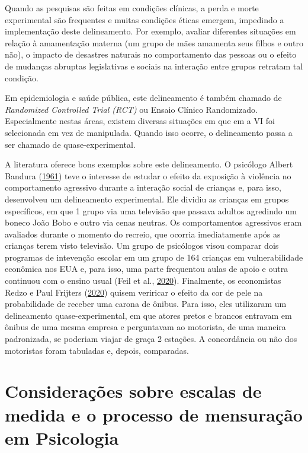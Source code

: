 \documentclass[
]{book}
\begin{document}
Quando as pesquisas são feitas em condições clínicas, a perda e morte
experimental são frequentes e muitas condições éticas emergem, impedindo
a implementação deste delineamento. Por exemplo, avaliar diferentes
situações em relação à amamentação materna (um grupo de mães amamenta
seus filhos e outro não), o impacto de desastres naturais no
comportamento das pessoas ou o efeito de mudanças abruptas legislativas
e sociais na interação entre grupos retratam tal condição.

Em epidemiologia e saúde pública, este delineamento é também chamado de
\emph{Randomized Controlled Trial (RCT)} ou Ensaio Clínico Randomizado.
Especialmente nestas áreas, existem diversas situações em que em a VI
foi selecionada em vez de manipulada. Quando isso ocorre, o delineamento
passa a ser chamado de quase-experimental.

A literatura oferece bons exemplos sobre este delineamento. O psicólogo
Albert Bandura (\protect\hyperlink{ref-Bandura1961}{1961}) teve o
interesse de estudar o efeito da exposição à violência no comportamento
agressivo durante a interação social de crianças e, para isso,
desenvolveu um delineamento experimental. Ele dividiu as crianças em
grupos específicos, em que 1 grupo via uma televisão que passava adultos
agredindo um boneco João Bobo e outro via cenas neutras. Os
comportamentos agressivos eram avaliados durante o momento do recreio,
que ocorria imediatamente após as crianças terem visto televisão. Um
grupo de psicólogos visou comparar dois programas de intevenção escolar
em um grupo de 164 crianças em vulnerabilidade econômica nos EUA e, para
isso, uma parte frequentou aulas de apoio e outra continuou com o ensino
usual (Feil et al., \protect\hyperlink{ref-Feil2020}{2020}). Finalmente,
os economistas Redzo e Paul Frijters
(\protect\hyperlink{ref-Mujcic2020}{2020}) quisem veriricar o efeito da
cor de pele na probabilidade de receber uma carona de ônibus. Para isso,
eles utilizaram um delineamento quase-experimental, em que atores pretos
e brancos entravam em ônibus de uma mesma empresa e perguntavam ao
motorista, de uma maneira padronizada, se poderiam viajar de graça 2
estações. A concordância ou não dos motoristas foram tabuladas e,
depois, comparadas.

\hypertarget{considerauxe7uxf5es-sobre-escalas-de-medida-e-o-processo-de-mensurauxe7uxe3o-em-psicologia}{%
\section{Considerações sobre escalas de medida e o processo de
mensuração em
Psicologia}\label{considerauxe7uxf5es-sobre-escalas-de-medida-e-o-processo-de-mensurauxe7uxe3o-em-psicologia}}
\end{document}
